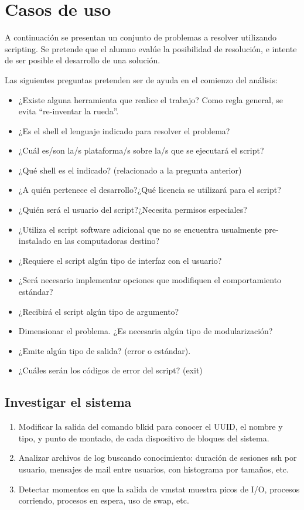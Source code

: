 \section{Casos de uso}

A continuación se presentan un conjunto de problemas a resolver utilizando scripting. Se pretende que el alumno evalúe la posibilidad de resolución, e intente de ser posible el desarrollo de una solución. 

Las siguientes preguntas pretenden ser de ayuda en el comienzo del análisis:
\begin{itemize}
\item ¿Existe alguna herramienta que realice el trabajo? Como regla general, se evita ``re-inventar la rueda''.
\item ¿Es el shell el lenguaje indicado para resolver el problema?
\item ¿Cuál es/son la/s plataforma/s sobre la/s que se ejecutará el script? 
\item ¿Qué shell es el indicado? (relacionado a la pregunta anterior)
\item ¿A quién pertenece el desarrollo?¿Qué licencia se utilizará para el script?
\item ¿Quién será el usuario del script?¿Necesita permisos especiales?
\item ¿Utiliza el script software adicional que no se encuentra usualmente pre-instalado en las computadoras destino?
\item ¿Requiere el script algún tipo de interfaz con el usuario? 
\item ¿Será necesario implementar opciones que modifiquen el comportamiento estándar?
\item ¿Recibirá el script algún tipo de argumento?
\item Dimensionar el problema. ¿Es necesaria algún tipo de modularización?
\item ¿Emite algún tipo de salida? (error o estándar). 
\item ¿Cuáles serán los códigos de error del script? (exit)
\end{itemize}

\subsection{Investigar el sistema}
\begin{enumerate}
	\item 
Modificar la salida del comando blkid para conocer el UUID, el nombre y tipo, y punto de montado, de cada dispositivo de bloques del sistema.
	\item 
Analizar archivos de log buscando conocimiento: duración de sesiones ssh por usuario, mensajes de mail entre usuarios, con histograma por tamaños, etc.
	\item 
Detectar momentos en que la salida de vmstat muestra picos de I/O, procesos corriendo, procesos en espera, uso de swap, etc.
\end{enumerate}


